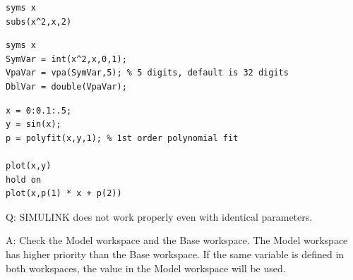 \documentclass[8pt]{innovativeinnovation-cheatsheet}
\begin{document}
\begin{multicols*}{3}
\begin{lstlisting}
syms x
subs(x^2,x,2)
\end{lstlisting}



\begin{lstlisting}
syms x
SymVar = int(x^2,x,0,1);
VpaVar = vpa(SymVar,5); % 5 digits, default is 32 digits
DblVar = double(VpaVar);
\end{lstlisting}



\begin{lstlisting}
x = 0:0.1:.5;
y = sin(x);
p = polyfit(x,y,1); % 1st order polynomial fit

plot(x,y)
hold on
plot(x,p(1) * x + p(2))
\end{lstlisting}


Q: SIMULINK does not work properly even with identical parameters.

A: Check the Model workspace and the Base workspace. The Model workspace has higher priority than the Base workspace. If the same variable is defined in both workspaces, the value in the Model workspace will be used.







\vfill


\end{multicols*}
\end{document}
